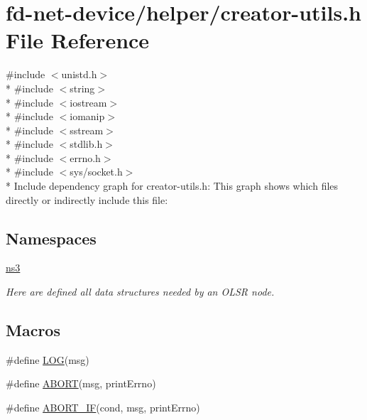 \hypertarget{creator-utils_8h}{}\section{fd-\/net-\/device/helper/creator-\/utils.h File Reference}
\label{creator-utils_8h}
{\ttfamily \#include $<$unistd.\+h$>$}\\*
{\ttfamily \#include $<$string$>$}\\*
{\ttfamily \#include $<$iostream$>$}\\*
{\ttfamily \#include $<$iomanip$>$}\\*
{\ttfamily \#include $<$sstream$>$}\\*
{\ttfamily \#include $<$stdlib.\+h$>$}\\*
{\ttfamily \#include $<$errno.\+h$>$}\\*
{\ttfamily \#include $<$sys/socket.\+h$>$}\\*
Include dependency graph for creator-\/utils.h\+:
This graph shows which files directly or indirectly include this file\+:
\subsection*{Namespaces}
\begin{DoxyCompactItemize}
\item 
 \hyperlink{namespacens3}{ns3}
\begin{DoxyCompactList}\small\item\em Here are defined all data structures needed by an O\+L\+SR node. \end{DoxyCompactList}\end{DoxyCompactItemize}
\subsection*{Macros}
\begin{DoxyCompactItemize}
\item 
\#define \hyperlink{creator-utils_8h_a158a8c64f24645c7478298399825737f}{L\+OG}(msg)
\item 
\#define \hyperlink{creator-utils_8h_ac1fbabec36a484b1551c2855ce8a0514}{A\+B\+O\+RT}(msg,  print\+Errno)
\item 
\#define \hyperlink{creator-utils_8h_a91c11c90ad2f1672fbd3c031038dce16}{A\+B\+O\+R\+T\+\_\+\+IF}(cond,  msg,  print\+Errno)
\end{DoxyCompactItemize}
